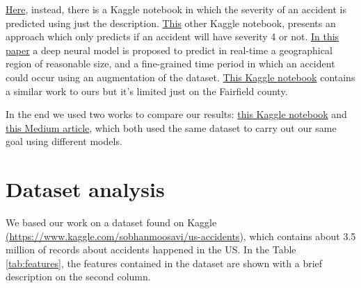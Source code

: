 \documentclass{article}
\begin{document}
\href{https://www.kaggle.com/nikitagrec/usa-accidents-plotly-maps-text-classification}{Here}, instead, there is a Kaggle notebook in which the severity of an accident is predicted using just the description.
\href{https://www.kaggle.com/jingzongwang/usa-car-accidents-severity-prediction}{This} other Kaggle notebook, presents an approach which only predicts if an accident will have severity 4 or not.
\href{https://arxiv.org/pdf/1909.09638.pdf}{In this paper} a deep neural model is proposed to predict in real-time a geographical region of reasonable size, and a fine-grained time period in which an accident could occur using an augmentation of the dataset.
\href{https://www.kaggle.com/davidroberts13/us-traffic-analysis-folium-rfm-wordcloud}{This Kaggle notebook} contains a similar work to ours but it's limited just on the Fairfield county.

In the end we used two works to compare our results: \href{https://www.kaggle.com/gcdatkin/automobile-accident-severity-prediction#Results}{this Kaggle notebook} and \href{https://medium.com/@vaibhavgope02/predicting-accident-severity-with-us-accidents-dataset-4aeaaae0b0af}{this Medium article}, which both used the same dataset to carry out our same goal using different models.

\section{Dataset analysis}
We based our work on a dataset found on Kaggle \href{https://www.kaggle.com/sobhanmoosavi/us-accidents}{(https://www.kaggle.com/sobhanmoosavi/us-accidents}), which contains about 3.5 million of records about accidents happened in the US.
In the Table \ref{tab:features}, the features contained in the dataset are shown with a brief description on the second column.
\end{document}
